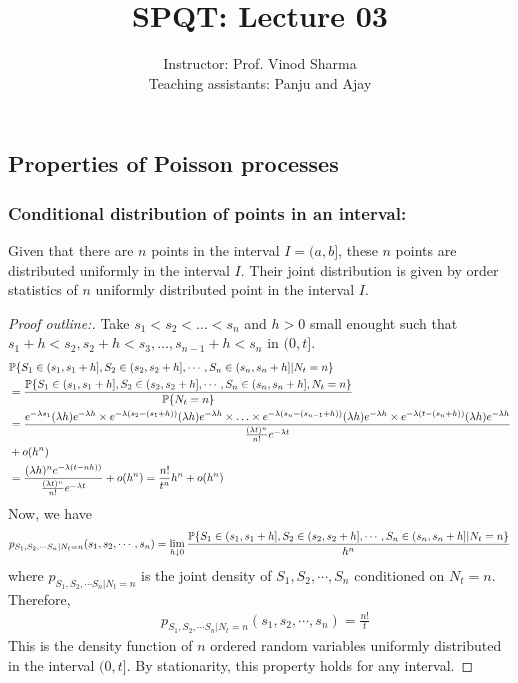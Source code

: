 \documentclass[all-lectures.tex]{subfiles}
\title{SPQT: Lecture 03}
\author{Instructor: Prof. Vinod Sharma \\ Teaching assistants: Panju and Ajay}
\begin{document}
%
\setcounter{chapter}{1}
\setcounter{section}{3}

\section*{}
\setcounter{subsection}{0}
\subsection{Properties of Poisson processes}
\subsubsection*{Conditional distribution of points in an interval:} 
\begin{thm}
Given that there are $n$ points in the interval $I = (a,b]$, these $n$ points are distributed uniformly in the interval $I$. Their joint distribution is given by order statistics of $n$ uniformly distributed point in the interval $I$.
\end{thm}
\begin{proof}[Proof outline:]
{Take $s_1 < s_2 < \dots<s_n$ and $h>0$ small enought such that $s_1+h < s_2, s_2+h < s_3, \dots, s_{n-1}+h < s_n$ in $(0,t]$.
\begin{align*}
&\P\{S_1\in (s_1,s_1+h],S_2\in (s_2,s_2+h],\cdots,S_n\in (s_n,s_n+h] |N_t = n\}  \\
&= \frac{\P\{S_1\in (s_1,s_1+h],S_2\in (s_2,s_2+h],\cdots,S_n\in (s_n,s_n+h],N_t=n\}}{\P\{N_t=n\}}  \\
 &= \frac{ e^{-\lambda s_1} (\lambda h)e^{-\lambda h} \times e^{-\lambda (s_2-(s_1+h))}(\lambda h)e^{-\lambda h} \times \ldots \times e^{-\lambda (s_n-(s_{n-1}+h))} (\lambda h) e^{-\lambda h} \times e^{-\lambda (t-(s_n+h))} (\lambda h)  e^{-\lambda h} }{ \frac{(\lambda t)^n }{n!} e^{-\lambda t} } \\ &+ o(h^n)\\
 &= \frac{ (\lambda h)^n e^{-\lambda(t-nh))}}{ \frac{(\lambda t)^n }{n!} e^{-\lambda t} } + o(h^n) = \frac{n!}{t^n} h^n + o(h^n)
\end{align*}
Now, we have 
\begin{align*}
p_{S_1,S_2,\cdots S_n | N_t=n}(s_1,s_2,\cdots,s_n) &= \lim_{h \downarrow 0} \frac{\P\{S_1\in (s_1,s_1+h],S_2\in (s_2,s_2+h],\cdots,S_n\in (s_n,s_n+h] |N_t = n\}}{h^n} \\
\end{align*}
where $p_{S_1,S_2,\cdots S_n | N_t=n}$ is the joint density of $S_1,S_2,\cdots,S_n$ conditioned on $N_t=n$. Therefore, 
\begin{align*}
&p_{S_1,S_2,\cdots S_n | N_t=n}(s_1,s_2,\cdots,s_n) = \frac{n!}{t}
\end{align*}
}
This is the density function of $n$ ordered random variables uniformly distributed in the interval $(0,t]$. By stationarity, this property holds for any interval. \qedhere
\end{proof}
\end{document}
